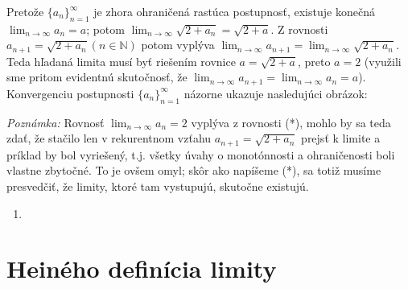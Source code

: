 Pretože ${\{a_n\}}_{n=1}^\infty$ je zhora ohraničená rastúca postupnosť, existuje konečná $\lim_{n \rightarrow \infty} a_n=a$; potom $\lim_{n \rightarrow \infty}\sqrt{2+a_n}=\sqrt{2+a}$. Z rovnosti $a_{n+1}=\sqrt{2+a_n} (n \in \mathbb{N})$ potom vyplýva $\lim_{n \rightarrow \infty} a_{n+1}=\lim_{n \rightarrow \infty} \sqrt{2+a_n}$. Teda hľadaná limita musí byť riešením rovnice $a=\sqrt{2+a}$, preto $a=2$ (využili sme pritom evidentnú skutočnosť, že $\lim_{n \rightarrow \infty} a_{n+1}=\lim_{n \rightarrow \infty} a_n=a$). Konvergenciu postupnosti ${\{a_n\}}_{n=1}^\infty$ názorne ukazuje nasledujúci obrázok:

\textit{Poznámka:}
Rovnosť $\lim_{n \rightarrow \infty} a_n=2$ vyplýva z rovnosti (*), mohlo by sa teda zdať, že stačilo len v rekurentnom vzťahu $a_{n+1}=\sqrt{2+a_n}$ prejsť k limite a príklad by bol vyriešený, t.j. všetky úvahy o monotónnosti a ohraničenosti boli vlastne zbytočné. To je ovšem omyl; skôr ako napíšeme (*), sa totiž musíme presvedčiť, že limity, ktoré tam vystupujú, skutočne existujú.

\begin{enumerate}[resume]
	\item {}
\end{enumerate}

\section{Heiného definícia limity}
